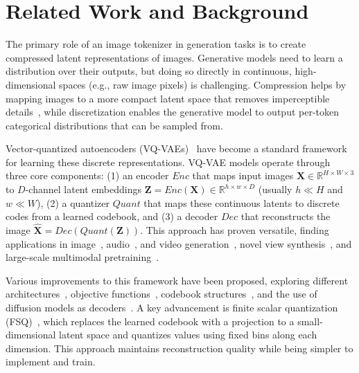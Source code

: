 \section{Related Work and Background}
\label{sec:relatedwork}

The primary role of an image tokenizer in generation tasks is to create compressed latent representations of images. Generative models need to learn a distribution over their outputs, but doing so directly in continuous, high-dimensional spaces (e.g., raw image pixels) is challenging. Compression helps by mapping images to a more compact latent space that removes imperceptible details~\cite{rombach2022high}, while discretization enables the generative model to output per-token categorical distributions that can be sampled from.

Vector-quantized autoencoders (VQ-VAEs)~\cite{van2017neural,razavi2019generating,esser2021taming} have become a standard framework for learning these discrete representations. VQ-VAE models operate through three core components: (1) an encoder $Enc$ that maps input images $\bm{X} \in \mathbb{R}^{H \times W \times 3}$ to $D$-channel latent embeddings $\bm{Z} = Enc(\bm{X}) \in \mathbb{R}^{h \times w \times D}$ (usually $h \ll H$ and $w \ll W$), (2) a quantizer $Quant$ that maps these continuous latents to discrete codes from a learned codebook, and (3) a decoder $Dec$ that reconstructs the image $\bm{\hat{X}} = Dec(Quant(\bm{Z}))$. This approach has proven versatile, finding applications in image~\cite{Chang2022MaskGIT, Chang2023Muse, Li2022MAGE}, audio~\cite{baevski2019vq}, and video generation~\cite{Villegas2022Phenaki,Hu2023GAIA1AG,Kondratyuk2023VideoPoet}, novel view synthesis~\cite{yan2021videogpt}, and large-scale multimodal pretraining~\cite{Lu2022UnifiedIO, Lu2023UnifiedIO2,4m,4m21,team2024chameleon,wang2024emu3}.

Various improvements to this framework have been proposed, exploring different architectures~\cite{yu2021improvedvqgan}, objective functions~\cite{esser2021taming, Hu2023GAIA1AG}, codebook structures~\cite{zhang2023regularized,yu2023magvitv2}, and the use of diffusion models as decoders~\cite{Shi2022DiVAE, 4m, Xu2024DisCoDiff, Zhao2024epsilonVAE}. A key advancement is finite scalar quantization (FSQ)~\cite{mentzer2023fsq}, which replaces the learned codebook with a projection to a small-dimensional latent space and quantizes values using fixed bins along each dimension. This approach maintains reconstruction quality while being simpler to implement and train.

